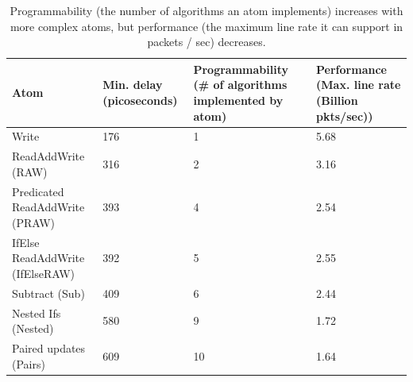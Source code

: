 \begin{table}[!t]
  \begin{scriptsize}
  \begin{tabular}{|p{}|p{}|p{}|p{}|}
  \hline
  Atom & Min. delay (picoseconds) & Programmability (\# of algorithms implemented by atom) & Performance (Max. line rate (Billion pkts/sec)) \\
  \hline
  Write & 176 & 1  & 5.68 \\
  \hline
  ReadAddWrite (RAW) & 316 & 2 & 3.16\\
  \hline
  \pbox{0.1\textwidth}
  {Predicated\\
  ReadAddWrite (PRAW)} & 393 & 4 & 2.54 \\
  \hline
  IfElse ReadAddWrite (IfElseRAW) & 392 & 5 & 2.55 \\
  \hline
  Subtract (Sub) & 409 & 6 & 2.44 \\
  \hline
  Nested Ifs (Nested) & 580 & 9 & 1.72 \\
  \hline
  Paired updates (Pairs) & 609 & 10 & 1.64 \\
  \hline
  \end{tabular}
\end{scriptsize}
\caption{Programmability (the number of algorithms an atom implements)
increases with more complex atoms, but performance (the maximum line rate it
can support in packets / sec) decreases.}
\label{tab:perfprog}
\end{table}

